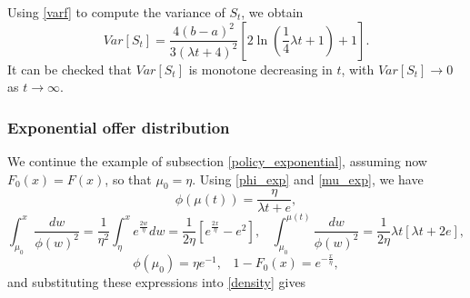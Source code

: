 \documentclass{article}
\numberwithin{equation}{section}
\begin{document}

Using \eqref{varf} to compute the variance of $S_t$, we obtain
\begin{equation}\label{uni_var}Var[S_t]=\frac{4(b-a)^2}{3(\lambda t +4)^2} \left[2
	\ln\left(\frac{1}{4}\lambda t+1 \right)+1\right].\end{equation}
It can be checked that $Var[S_t]$ 
is monotone decreasing in $t$, with $Var[S_t]\rightarrow 0$ 
as $t\rightarrow \infty$.

\subsubsection{Exponential offer distribution}
\label{dist_exponential}

We continue the example of subsection \ref{policy_exponential}, assuming now 
$F_0(x)=F(x)$, so that $\mu_0=\eta$.
Using \eqref{phi_exp} and \eqref{mu_exp}, we have
\begin{equation}\label{exp_phi_mu}\phi(\mu(t))=\frac{\eta}{\lambda t+e},\end{equation}
$$\int_{\mu_0}^x\frac{dw}{\phi(w)^2}=\frac{1}{\eta^2}\int_{\eta}^xe^{\frac{2w}{\eta}}dw=\frac{1}{2\eta}\left[e^{\frac{2x}{\eta}}-e^{2} \right],\;\;\;\int_{\mu_0}^{\mu(t)} \frac{dw}{\phi(w)^2}=\frac{1}{2\eta}\lambda t\left[\lambda t+2e \right],$$
$$\phi(\mu_0)=\eta e^{-1},\;\;\;1-F_0(x)=e^{-\frac{x}{\eta}},$$
and substituting these expressions into
\eqref{density} gives
	
\end{document}
